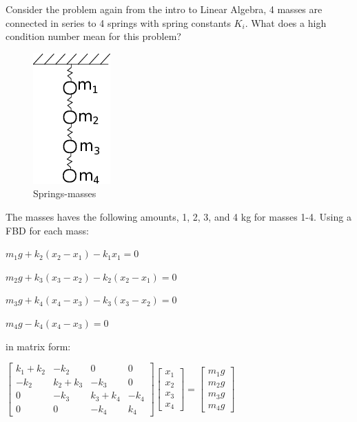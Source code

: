 \documentclass[11pt]{article}
\makeatletter
\def\maxwidth{\ifdim\Gin@nat@width>\linewidth\linewidth
    \else\Gin@nat@width\fi}
\let\Oldincludegraphics\includegraphics
\renewcommand{\includegraphics}[1]{\Oldincludegraphics[width=.8\maxwidth]{#1}}
\makeatother
\begin{document}
    Consider the problem again from the intro to Linear Algebra, 4 masses
are connected in series to 4 springs with spring constants $K_{i}$.
What does a high condition number mean for this problem?

\begin{figure}[htbp]
\centering
\includegraphics{../lecture_09/mass_springs.png}
\caption{Springs-masses}
\end{figure}

The masses haves the following amounts, 1, 2, 3, and 4 kg for masses
1-4. Using a FBD for each mass:

$m_{1}g+k_{2}(x_{2}-x_{1})-k_{1}x_{1}=0$

$m_{2}g+k_{3}(x_{3}-x_{2})-k_{2}(x_{2}-x_{1})=0$

$m_{3}g+k_{4}(x_{4}-x_{3})-k_{3}(x_{3}-x_{2})=0$

$m_{4}g-k_{4}(x_{4}-x_{3})=0$

in matrix form:

$\left[ \begin{array}{cccc} k_{1}+k_{2} & -k_{2} & 0 & 0 \\ -k_{2} & k_{2}+k_{3} & -k_{3} & 0 \\ 0 & -k_{3} & k_{3}+k_{4} & -k_{4} \\ 0 & 0 & -k_{4} & k_{4} \end{array} \right] \left[ \begin{array}{c} x_{1} \\ x_{2} \\ x_{3} \\ x_{4} \end{array} \right]= \left[ \begin{array}{c} m_{1}g \\ m_{2}g \\ m_{3}g \\ m_{4}g \end{array} \right]$
\end{document}
